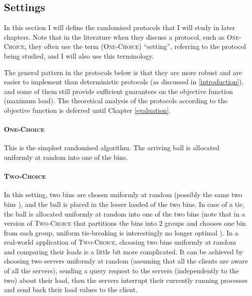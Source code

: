 \subsection{Settings}

In this section I will define the randomised protocols that I will study in later chapters. Note that in the literature when they discuss a protocol, such as \textsc{One-Choice}, they often use the term (\textsc{One-Choice}) ``setting'', referring to the protocol being studied, and I will also use this terminology.


The general pattern in the protocols below is that they are more robust and are easier to implement than deterministic protocols (as discussed in \ref{introduction}), and some of them still provide sufficient guarantees on the objective function (maximum load). The theoretical analysis of the protocols according to the objective function is deferred until Chapter \ref{evaluation}.


\paragraph{\textsc{One-Choice}}

This is the simplest randomised algorithm. The arriving ball is allocated uniformly at random into one of the bins.

\paragraph{\textsc{Two-Choice}}

In this setting, two bins are chosen uniformly at random (possibly the same two bins ), and the ball is placed in the lesser loaded of the two bins. In case of a tie, the ball is allocated uniformly at random into one of the two bins (note that in a version of \textsc{Two-Choice} that partitions the bins into $2$ groups and chooses one bin from each group, uniform tie-breaking is interestingly no longer optimal \cite{vocking2003tiebreaking}). In a real-world application of \textsc{Two-Choice}, choosing two bins uniformly at random and comparing their loads is a little bit more complicated. It can be achieved by choosing two servers uniformly at random (assuming that all the clients are aware of all the servers), sending a query request to the servers (independently to the two) about their load, then the servers interrupt their currently running processes and send back their load values to the client.


